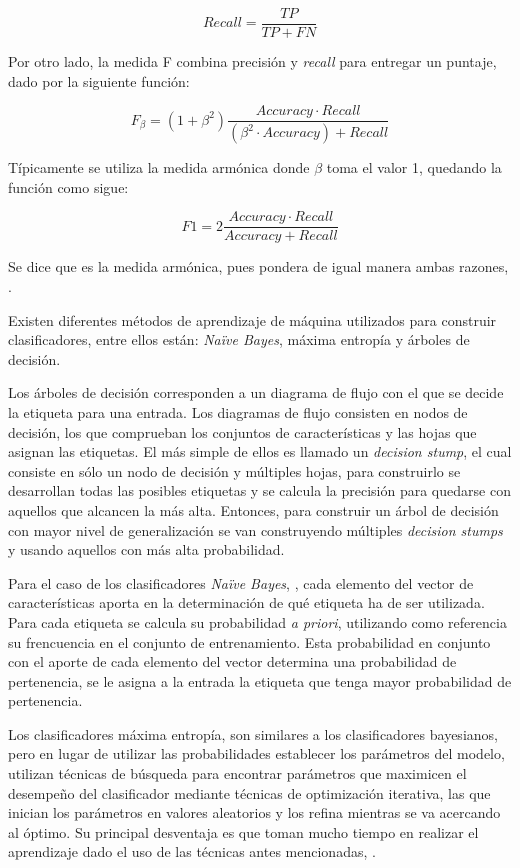 \[
	Recall = \frac{TP}{TP+FN}
\]

Por otro lado, la medida F combina precisión y \textit{recall} para entregar un puntaje, dado por la siguiente función:

\[
	F_{\beta} = (1+\beta^{2})\frac{Accuracy · Recall}{(\beta^{2} · Accuracy) + Recall}
\]

Típicamente se utiliza la medida armónica donde $\beta$ toma el valor 1, quedando la función como sigue:

\[
	F1 = 2\frac{Accuracy · Recall}{ Accuracy + Recall}
\]

Se dice que es la medida armónica, pues pondera de igual manera ambas razones, \citep{FMeasureInterpret}.

Existen diferentes métodos de aprendizaje de máquina utilizados para construir clasificadores, entre ellos están: \textit{Naïve Bayes}, máxima entropía y árboles de decisión.

Los árboles de decisión corresponden a un diagrama de flujo con el que se decide la etiqueta para una entrada. Los diagramas de flujo consisten en nodos de decisión, los que comprueban los conjuntos de características y las hojas que asignan las etiquetas. El más simple de ellos es llamado un \textit{decision stump}, el cual consiste en sólo un nodo de decisión y múltiples hojas, para construirlo se desarrollan todas las posibles etiquetas y se calcula la precisión para quedarse con aquellos que alcancen la más alta. Entonces, para construir un árbol de decisión con mayor nivel de generalización se van construyendo múltiples \textit{decision stumps} y usando aquellos con más alta probabilidad.

Para el caso de los clasificadores \textit{Naïve Bayes}, \citep{NaiveBayes2}, cada elemento del vector de características aporta en la determinación de qué etiqueta ha de ser utilizada. Para cada etiqueta se calcula su probabilidad \textit{a priori}, utilizando como referencia su frencuencia en el conjunto de entrenamiento. Esta probabilidad en conjunto con el aporte de cada elemento del vector determina una probabilidad de pertenencia, se le asigna a la entrada la etiqueta que tenga mayor probabilidad de pertenencia.

Los clasificadores máxima entropía, son similares a los clasificadores bayesianos, pero en lugar de utilizar las probabilidades establecer los parámetros del modelo, utilizan técnicas de búsqueda para encontrar parámetros que maximicen el desempeño del clasificador mediante técnicas de optimización iterativa, las que inician los parámetros en valores aleatorios y los refina mientras se va acercando al óptimo. Su principal desventaja es que toman mucho tiempo en realizar el aprendizaje dado el uso de las técnicas antes mencionadas, \citep{NPLK}.

